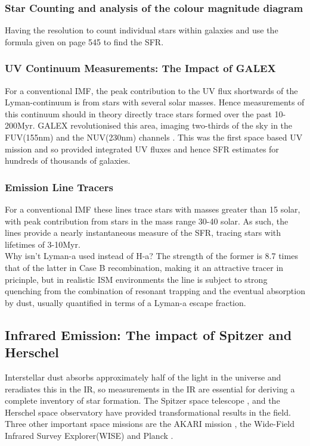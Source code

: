 \documentclass{literature}
\begin{document}
\subsubsection{Star Counting and analysis of the colour magnitude diagram}
Having the resolution to count individual stars within galaxies and use the formula given on page 545 to find the SFR. 
\subsubsection{UV Continuum Measurements: The Impact of GALEX}
For a conventional IMF, the peak contribution to the UV flux shortwards of the Lyman-continuum is from stars with several solar masses. Hence measurements of this continuum should in theory directly trace stars formed over the past 10-200Myr. GALEX revolutionised this area, imaging two-thirds of the sky in the FUV(155nm) and the NUV(230nm) channels \citep{Martin_2005}. This was the first space based UV mission and so provided integrated UV fluxes and hence SFR estimates for hundreds of thousands of galaxies. 
\subsubsection{Emission Line Tracers}
For a conventional IMF these lines trace stars with masses greater than 15 solar, with peak contribution from stars in the mass range 30-40 solar. As such, the lines provide a nearly instantaneous measure of the SFR, tracing stars with lifetimes of 3-10Myr. \\ 
Why isn't Lyman-a used instead of H-a? The strength of the former is 8.7 times that of the latter in Case B recombination, making it an attractive tracer in pricinple, but in realistic ISM environments the line is subject to strong quenching from the combination of resonant trapping and the eventual absorption by dust, usually quantified in terms of a Lyman-a escape fraction. 
\subsection{Infrared Emission: The impact of Spitzer and Herschel}
Interstellar dust absorbs approximately half of the light in the universe and reradiates this in the IR, so measurements in the IR are essential for deriving a complete inventory of star formation. The Spitzer space telescope \citep{Gehrz_2007}, \citep{Werner_2004} and the Herschel space observatory \citep{Pilbratt_2010} have provided transformational results in the field. Three other important space missions are the AKARI mission \citep{Murakami_2007}, the Wide-Field Infrared Survey Explorer(WISE) \citep{Wright_2010} and Planck \citep{Planck_2011}. 
\end{document}
